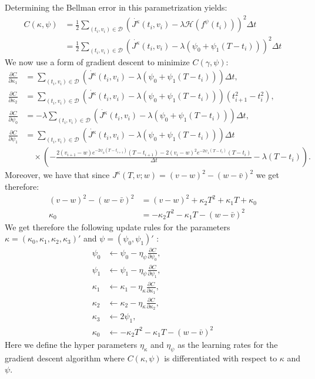 \documentclass[oneside, a4paper, onecolumn, 11pt]{article}
\begin{document}
Determining the Bellman error in this parametrization yields: 
\begin{align}
       C(\kappa, \psi) &= \frac{1}{2}\sum_{(t_i,v_i) \in \mathcal{D}}\left(\dot{J^\kappa}(t_i, v_i) - \lambda \mathcal{H}(f^\psi(t_i))\right)^2 \Delta t \\ 
       &= \frac{1}{2}\sum_{(t_i,v_i) \in \mathcal{D}}\left(\dot{J^\kappa}(t_i, v_i) - \lambda (\psi_0+ \psi_1(T-t_i))\right)^2 \Delta t 
\end{align}
We now use a form of gradient descent to minimize $C(\gamma,\psi)$\cite{WangZhou2020}:
\begin{align}
\frac{\partial C}{\partial \kappa_1} &= \sum_{(t_i,v_i) \in \mathcal{D}} \left( \dot{J^\kappa}(t_i, v_i) - \lambda (\psi_0 + \psi_1(T - t_i)) \right) \Delta t, \\
\frac{\partial C}{\partial \kappa_2} &= \sum_{(t_i,v_i) \in \mathcal{D}} \left( \dot{J^\kappa}(t_i, v_i) - \lambda (\psi_0 + \psi_1(T - t_i)) \right) (t^2_{i+1} - t^2_i), \\
\frac{\partial C}{\partial \psi_0} &= -\lambda \sum_{(t_i,v_i) \in \mathcal{D}} \left( \dot{J^\kappa}(t_i, v_i) - \lambda (\psi_0 + \psi_1(T - t_i)) \right) \Delta t, \\ 
\frac{\partial C}{\partial \psi_1} &= \sum_{(t_i,v_i) \in \mathcal{D}} \left( \dot{J^\kappa}(t_i, v_i) - \lambda (\psi_0 + \psi_1(T - t_i)) \right) \Delta t \\
&\quad \times \left( -\frac{2(v_{i+1} - w)e^{-2\psi_0(T - t_{i+1})}(T - t_{i+1}) - 2(v_i - w)^2 e^{-2\psi_1(T - t_i)}(T - t_i)}{\Delta t} - \lambda(T - t_i) \right).
\end{align}
Moreover, we have that since $J^{\kappa}(T, v; w) =(v-w)^2- (w-\bar{v})^2 $ we get therefore: 
\begin{align*}
    (v-w)^2 - (w-\bar{v})^2 &= (v-w)^2 + \kappa_2T^2 + \kappa_1 T + \kappa_0 \\ 
    \kappa_0 &= -\kappa_2T^2- \kappa_1 T - (w-\bar{v})^2
\end{align*}
We get therefore the following update rules for  the parameters $\kappa = (\kappa_0,\kappa_1,\kappa_2, \kappa_3)'$ and $\psi = (\psi_0, \psi_1)'$ : 
\begin{align}
\psi_0 & \leftarrow \psi_0 - \eta_\psi \frac{\partial C}{\partial \psi_0}, \\ 
\psi_1 & \leftarrow \psi_1 - \eta_\psi \frac{\partial C}{\partial \psi_1}, \\ \label{psi_1:negativity_reason}
\kappa_1  &\leftarrow \kappa_1 - \eta_\kappa \frac{\partial C}{\partial \kappa_1},\\
\kappa_2 &\leftarrow \kappa_2 - \eta_\kappa \frac{\partial C}{\partial \kappa_2}, \\ 
\kappa_3 &\leftarrow 2\psi_1,   \\ 
\kappa_0 &\leftarrow-\kappa_2T^2- \kappa_1 T - (w-\bar{v})^2
\end{align} Here we define the hyper parameters $\eta_\kappa$ and $\eta_\psi$ as the learning rates for the gradient descent algorithm where $C(\kappa,\psi)$ is differentiated with respect to $\kappa$ and $\psi$.
\end{document}
